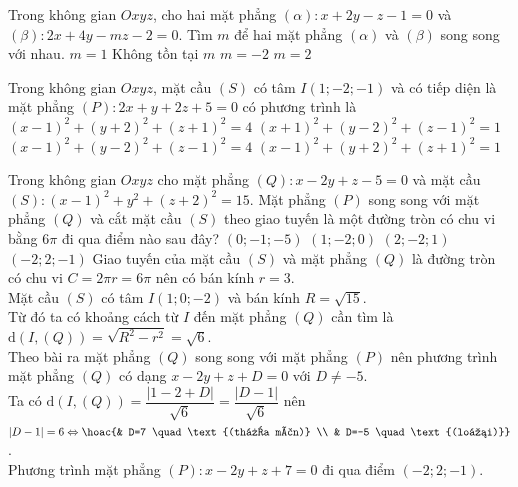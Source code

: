 \begin{ex}%
	Trong không gian $Oxyz$, cho hai mặt phẳng $\left(\alpha \right)\colon  x+2y-z-1=0$ và $\left(\beta \right)\colon  2x+4y-mz-2=0$. Tìm $m$ để hai mặt phẳng $\left(\alpha \right)$ và $\left(\beta \right)$ song song với nhau.
	\choice
	{$m=1$}
	{\True Không tồn tại $m$}
	{$m=-2$}
	{$m=2$}
\end{ex}
\begin{ex}%
	Trong không gian $Oxyz$, mặt cầu $(S)$ có tâm $I(1;-2;-1)$ và có tiếp diện là mặt phẳng $(P)\colon 2x+y+2z+5=0$ có phương trình là
	\choice
	{$(x-1)^2+(y+2)^2+(z+1)^2=4$}
	{$(x+1)^2+(y-2)^2+(z-1)^2=1$}
	{$(x-1)^2+(y-2)^2+(z-1)^2=4$}
	{\True $(x-1)^2+(y+2)^2+(z+1)^2=1$}
\end{ex}
\begin{ex}%
	Trong không gian $Oxyz$ cho mặt phẳng $(Q)\colon x-2y+z-5=0$ và mặt cầu $(S)\colon (x-1)^2+y^2+(z+2)^2=15$. Mặt phẳng $(P)$ song song với mặt phẳng $(Q)$ và cắt mặt cầu $(S)$ theo giao tuyến là một đường tròn có chu vi bằng $6\pi$ đi qua điểm nào sau đây?
	\choice
	{$(0;-1;-5)$}
	{$(1;-2;0)$}
	{$(2;-2;1)$}
	{\True $(-2;2;-1)$}
	\loigiai
	{Giao tuyến của mặt cầu $(S)$ và mặt phẳng $(Q)$ là đường tròn có chu vi $C=2\pi r=6\pi$ nên có bán kính $r=3$.\\
		Mặt cầu $(S)$ có tâm $I(1;0;-2)$ và bán kính $R=\sqrt{15}$.\\
		Từ đó ta có khoảng cách từ $I$ đến mặt phẳng $(Q)$ cần tìm là $\mathrm{d}(I,(Q))=\sqrt{R^2-r^2}=\sqrt{6}$.\\
		Theo bài ra mặt phẳng $(Q)$ song song với mặt phẳng $(P)$ nên phương trình mặt phẳng $(Q)$ có dạng $x-2y+z+D=0$ với $D\neq -5$.\\
		Ta có $\mathrm{d}(I,(Q))=\dfrac{|1-2+D|}{\sqrt{6}}=\dfrac{|D-1|}{\sqrt{6}}$ nên $|D-1|=6\Leftrightarrow\hoac{& D=7 \quad \text{(thỏa mãn)} \\ & D=-5 \quad \text{(loại)}}$.\\
		Phương trình mặt phẳng $(P)\colon x-2y+z+7=0$ đi qua điểm $(-2;2;-1)$.
	}
\end{ex}

